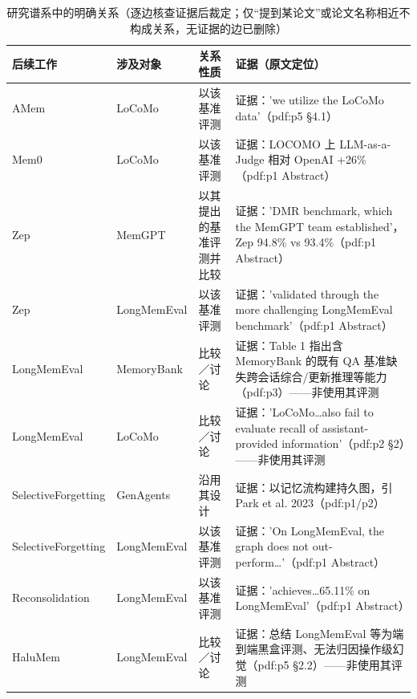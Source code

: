 \begin{table}[t]
\centering\small
\caption{研究谱系中的明确关系（逐边核查证据后裁定；仅``提到某论文''或论文名称相近不构成关系，无证据的边已删除）}\label{tab:genealogy}
\begin{tabular}{p{2.8cm}p{2.8cm}p{2.2cm}p{5.6cm}}
\toprule
后续工作 & 涉及对象 & 关系性质 & 证据（原文定位） \\
\midrule
AMem & LoCoMo & 以该基准评测 & 证据：'we utilize the LoCoMo data'（pdf:p5 §4.1） \\
Mem0 & LoCoMo & 以该基准评测 & 证据：LOCOMO 上 LLM-as-a-Judge 相对 OpenAI +26\%（pdf:p1 Abstract） \\
Zep & MemGPT & 以其提出的基准评测并比较 & 证据：'DMR benchmark, which the MemGPT team established'，Zep 94.8\% vs 93.4\%（pdf:p1 Abstract） \\
Zep & LongMemEval & 以该基准评测 & 证据：'validated through the more challenging LongMemEval benchmark'（pdf:p1 Abstract） \\
LongMemEval & MemoryBank & 比较／讨论 & 证据：Table 1 指出含 MemoryBank 的既有 QA 基准缺失跨会话综合/更新推理等能力（pdf:p3）——非使用其评测 \\
LongMemEval & LoCoMo & 比较／讨论 & 证据：'LoCoMo…also fail to evaluate recall of assistant-provided information'（pdf:p2 §2）——非使用其评测 \\
SelectiveForgetting & GenAgents & 沿用其设计 & 证据：以记忆流构建持久图，引 Park et al. 2023（pdf:p1/p2） \\
SelectiveForgetting & LongMemEval & 以该基准评测 & 证据：'On LongMemEval, the graph does not out-perform…'（pdf:p1 Abstract） \\
Reconsolidation & LongMemEval & 以该基准评测 & 证据：'achieves…65.11\% on LongMemEval'（pdf:p1 Abstract） \\
HaluMem & LongMemEval & 比较／讨论 & 证据：总结 LongMemEval 等为端到端黑盒评测、无法归因操作级幻觉（pdf:p5 §2.2）——非使用其评测 \\
\bottomrule
\end{tabular}
\end{table}